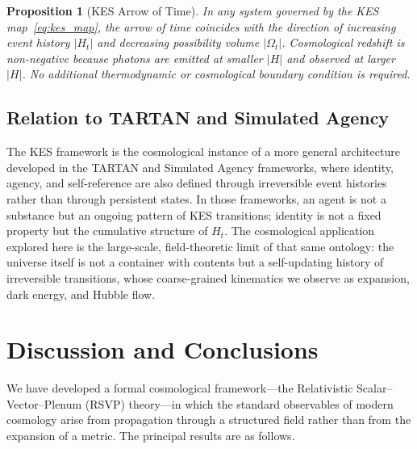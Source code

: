 \documentclass[12pt,a4paper]{article}
\newtheorem{proposition}[theorem]{Proposition}
\theoremstyle{remark}
\begin{document}
\begin{proposition}[KES Arrow of Time]
In any system governed by the KES map~\eqref{eq:kes_map}, the arrow of time
coincides with the direction of increasing event history $|H_t|$ and decreasing
possibility volume $|\Omega_t|$. Cosmological redshift is non-negative because
photons are emitted at smaller $|H|$ and observed at larger $|H|$. No additional
thermodynamic or cosmological boundary condition is required.
\end{proposition}

\subsection{Relation to TARTAN and Simulated Agency}

The KES framework is the cosmological instance of a more general architecture
developed in the TARTAN and Simulated Agency frameworks, where identity,
agency, and self-reference are also defined through irreversible event histories
rather than through persistent states. In those frameworks, an agent is not a
substance but an ongoing pattern of KES transitions; identity is not a fixed
property but the cumulative structure of $H_t$. The cosmological application
explored here is the large-scale, field-theoretic limit of that same ontology:
the universe itself is not a container with contents but a self-updating history
of irreversible transitions, whose coarse-grained kinematics we observe as
expansion, dark energy, and Hubble flow.

\section{Discussion and Conclusions}
\label{sec:conclusion}

We have developed a formal cosmological framework---the Relativistic Scalar--Vector--Plenum (RSVP) theory---in which the standard observables of modern cosmology arise from propagation through a structured field rather than from the expansion of a metric. The principal results are as follows.
\end{document}
